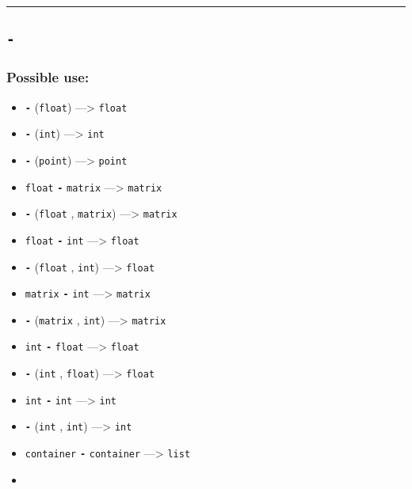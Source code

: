 \documentclass[]{book}
\providecommand{\tightlist}{%
  \setlength{\itemsep}{0pt}\setlength{\parskip}{0pt}}
\theoremstyle{definition}
\theoremstyle{definition}
\theoremstyle{definition}
\theoremstyle{remark}
\begin{document}
\begin{center}\rule{0.5\linewidth}{\linethickness}\end{center}

\subsection{\texorpdfstring{\texttt{-}}{-}}\label{section-1}

\subsubsection{Possible use:}\label{possible-use}

\begin{itemize}
\tightlist
\item
  \textbf{\texttt{-}} (\texttt{float}) ---\textgreater{} \texttt{float}
\item
  \textbf{\texttt{-}} (\texttt{int}) ---\textgreater{} \texttt{int}
\item
  \textbf{\texttt{-}} (\texttt{point}) ---\textgreater{} \texttt{point}
\item
  \texttt{float} \textbf{\texttt{-}} \texttt{matrix} ---\textgreater{}
  \texttt{matrix}
\item
  \textbf{\texttt{-}} (\texttt{float} , \texttt{matrix})
  ---\textgreater{} \texttt{matrix}
\item
  \texttt{float} \textbf{\texttt{-}} \texttt{int} ---\textgreater{}
  \texttt{float}
\item
  \textbf{\texttt{-}} (\texttt{float} , \texttt{int}) ---\textgreater{}
  \texttt{float}
\item
  \texttt{matrix} \textbf{\texttt{-}} \texttt{int} ---\textgreater{}
  \texttt{matrix}
\item
  \textbf{\texttt{-}} (\texttt{matrix} , \texttt{int}) ---\textgreater{}
  \texttt{matrix}
\item
  \texttt{int} \textbf{\texttt{-}} \texttt{float} ---\textgreater{}
  \texttt{float}
\item
  \textbf{\texttt{-}} (\texttt{int} , \texttt{float}) ---\textgreater{}
  \texttt{float}
\item
  \texttt{int} \textbf{\texttt{-}} \texttt{int} ---\textgreater{}
  \texttt{int}
\item
  \textbf{\texttt{-}} (\texttt{int} , \texttt{int}) ---\textgreater{}
  \texttt{int}
\item
  \texttt{container} \textbf{\texttt{-}} \texttt{container}
  ---\textgreater{} \texttt{list}
\item

\end{itemize}
\end{document}
